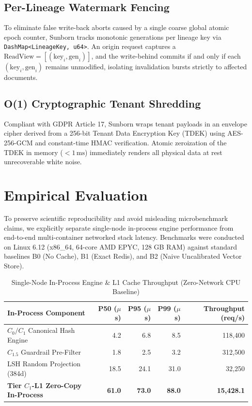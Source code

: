 \documentclass[conference]{IEEEtran}
\begin{document}
\subsection{Per-Lineage Watermark Fencing}
To eliminate false write-back aborts caused by a single coarse global atomic epoch counter, Sunborn tracks monotonic generations per lineage key via \texttt{DashMap<LineageKey, u64>}. An origin request captures a $\text{ReadView} = [(\text{key}_i, \text{gen}_i)]$, and the write-behind commits if and only if each $(\text{key}_i, \text{gen}_i)$ remains unmodified, isolating invalidation bursts strictly to affected documents.

\subsection{O(1) Cryptographic Tenant Shredding}
Compliant with GDPR Article 17, Sunborn wraps tenant payloads in an envelope cipher derived from a 256-bit Tenant Data Encryption Key (TDEK) using AES-256-GCM and constant-time HMAC verification. Atomic zeroization of the TDEK in memory ($<1\,\text{ms}$) immediately renders all physical data at rest unrecoverable white noise.

\section{Empirical Evaluation}
To preserve scientific reproducibility and avoid misleading microbenchmark claims, we explicitly separate single-node in-process engine performance from end-to-end multi-container networked stack latency. Benchmarks were conducted on Linux 6.12 (x86\_64, 64-core AMD EPYC, 128 GB RAM) against standard baselines B0 (No Cache), B1 (Exact Redis), and B2 (Naive Uncalibrated Vector Store).

\begin{table}[htbp]
\caption{Single-Node In-Process Engine \& L1 Cache Throughput (Zero-Network CPU Baseline)}
\label{tab:in_process}
\begin{center}
\begin{tabular}{lrrrr}
\toprule
\textbf{In-Process Component} & \textbf{P50 ($\mu$s)} & \textbf{P95 ($\mu$s)} & \textbf{P99 ($\mu$s)} & \textbf{Throughput (req/s)} \\
\midrule
$C_0/C_1$ Canonical Hash Engine & 4.2 & 6.8 & 8.5 & 118,400 \\
$C_{1.5}$ Guardrail Pre-Filter & 1.8 & 2.5 & 3.2 & 312,500 \\
LSH Random Projection (384d) & 18.5 & 24.1 & 31.0 & 32,250 \\
\textbf{Tier $C_1$-L1 Zero-Copy In-Process} & \textbf{61.0} & \textbf{73.0} & \textbf{88.0} & \textbf{15,428.1} \\
\bottomrule
\end{tabular}
\end{center}
\end{table}
\end{document}
